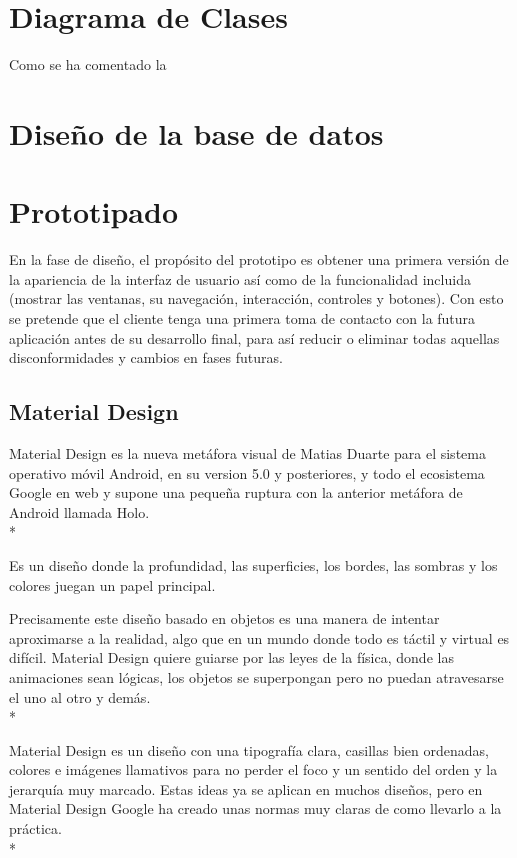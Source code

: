 \documentclass[../pfc.tex]{subfiles}
\begin{document}
	\section{Diagrama de Clases}
	
	Como se ha comentado la
	
	\section{Diseño de la base de datos}
	
	\section{Prototipado}
	
	En la fase de diseño, el propósito del prototipo es obtener una primera versión de la apariencia de la interfaz de usuario así como de la funcionalidad incluida (mostrar las ventanas, su navegación, interacción, controles y botones). Con esto se pretende que el cliente tenga una primera toma de contacto con la futura aplicación antes de su desarrollo final, para así reducir o eliminar todas aquellas disconformidades y cambios en fases futuras.
	
		\subsection{Material Design}
		Material Design es la nueva metáfora visual de Matias Duarte para el sistema operativo móvil Android, en su version 5.0 y posteriores, y todo el ecosistema Google en web y supone una pequeña ruptura con la anterior metáfora de Android llamada Holo. \\*
		
		Es un diseño donde la profundidad, las superficies, los bordes, las sombras y los colores juegan un papel principal.
		
		Precisamente este diseño basado en objetos es una manera de intentar aproximarse a la realidad, algo que en un mundo donde todo es táctil y virtual es difícil. Material Design quiere guiarse por las leyes de la física, donde las animaciones sean lógicas, los objetos se superpongan pero no puedan atravesarse el uno al otro y demás.\\*
		
		Material Design es un diseño con una tipografía clara, casillas bien ordenadas, colores e imágenes llamativos para no perder el foco y un sentido del orden y la jerarquía muy marcado. Estas ideas ya se aplican en muchos diseños, pero en Material Design Google ha creado unas normas muy claras de como llevarlo a la práctica.\\*
		
\end{document}
